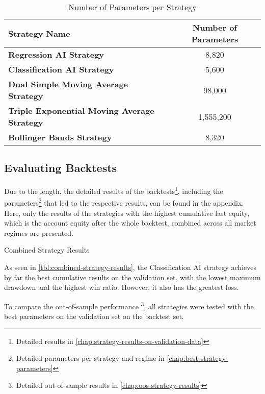 \begin{table}[H]
    \centering
    \begin{tabular}{L{8cm}c}
        \toprule
        \textbf{Strategy Name} & Number of Parameters
        \\
        \midrule
        \textbf{Regression AI Strategy}                     & 8,820     \\
        \textbf{Classification AI Strategy}                 & 5,600     \\
        \textbf{Dual Simple Moving Average Strategy}        & 98,000    \\
        \textbf{Triple Exponential Moving Average Strategy} & 1,555,200 \\
        \textbf{Bollinger Bands Strategy}                   & 8,320     \\
        \bottomrule
    \end{tabular}
    \caption{Number of Parameters per Strategy}
    \label{tbl:parameters-number}
\end{table}

\subsection{Evaluating Backtests}

Due to the length, the detailed results of the backtests\footnote{Detailed results in \autoref{chap:strategy-results-on-validation-data}}, including the parameters\footnote{Detailed parameters per strategy and regime in \autoref{chap:best-strategy-parameters}} that led to the respective results, can be found in the appendix.
Here, only the results of the strategies with the highest cumulative last equity, which is the account equity after the whole backtest, combined across all market regimes are presented.

\begin{table}[H]
    
    \caption{Combined Strategy Results}
    \label{tbl:combined-strategy-results}
\end{table}

\noindent
As seen in \autoref{tbl:combined-strategy-results}, the Classification AI strategy achieves by far the best cumulative results on the validation set, with the lowest maximum drawdown and the highest win ratio.
However, it also has the greatest loss.

To compare the out-of-sample performance \footnote{Detailed out-of-sample results in \autoref{chap:oos-strategy-results}}, all strategies were tested with the best parameters on the validation set on the backtest set.

